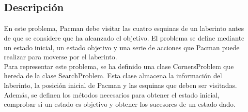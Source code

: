 \documentclass{report}
\begin{document}
        \subsection*{Descripción}
          \paragraph*{}{
            En este problema, Pacman debe visitar las cuatro esquinas de un laberinto antes de que se considere que ha alcanzado el objetivo. El problema se define mediante un estado inicial, un estado objetivo y una serie de acciones que Pacman puede realizar para moverse por el laberinto.\\
            Para representar este problema, se ha definido una clase CornersProblem que hereda de la clase SearchProblem. Esta clase almacena la información del laberinto, la posición inicial de Pacman y las esquinas que deben ser visitadas. Además, se definen los métodos necesarios para obtener el estado inicial, comprobar si un estado es objetivo y obtener los sucesores de un estado dado.\\
          }
\end{document}
